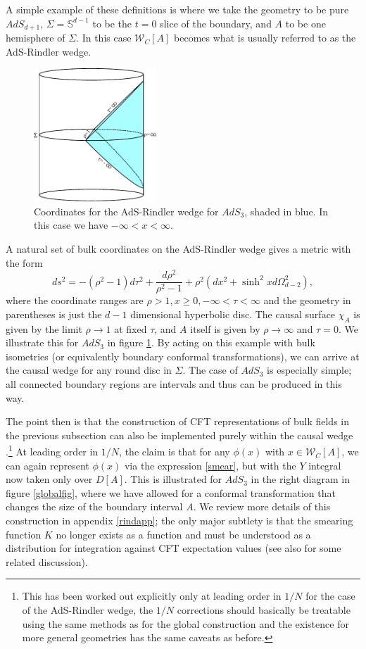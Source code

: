 \documentclass[12pt]{article}
\newcommand{\be}{\begin{equation}}
\newcommand{\ee}{\end{equation}}
\newcommand{\W}{\mathcal{W}}
\begin{document}
A simple example of these definitions is where we take the geometry to be pure $AdS_{d+1}$, $\Sigma=\mathbb{S}^{d-1}$ to be the $t=0$ slice of the boundary, and $A$ to be one hemisphere of $\Sigma$.  In this case $\W_C[A]$ becomes what is usually referred to as the AdS-Rindler wedge.   
\begin{figure}
\begin{center}
\includegraphics[height=5cm]{rindler.pdf}
\caption{Coordinates for the AdS-Rindler wedge for $AdS_3$, shaded in blue.  In this case we have $-\infty<x<\infty$.}\label{rindlerfig}
\end{center}
\end{figure}
A natural set of bulk coordinates on the AdS-Rindler wedge gives a metric with the form
\be
ds^2=-(\rho^2-1)d\tau^2+\frac{d\rho^2}{\rho^2-1}+\rho^2\left(dx^2+\sinh^2 x d\Omega_{d-2}^2\right),
\ee
where the coordinate ranges are $\rho>1, x\geq 0,-\infty<\tau<\infty$ and the geometry in parentheses is just the $d-1$ dimensional hyperbolic disc.  The causal surface $\chi_A$ is given by the limit $\rho \to 1$ at fixed $\tau$, and $A$ itself is given by $\rho\to \infty$ and $\tau=0$.  We illustrate this for $AdS_3$ in figure \ref{rindlerfig}.  By acting on this example with bulk isometries (or equivalently boundary conformal transformations), we can arrive at the causal wedge for any round disc in $\Sigma$.  The case of $AdS_3$ is especially simple; all connected boundary regions are intervals and thus can be produced in this way.  

The point then is that the construction of CFT representations of bulk fields in the previous subsection can also be implemented purely within the causal wedge \cite{Hamilton:2006az}.\footnote{This has been worked out explicitly only at leading order in $1/N$ for the case of the AdS-Rindler wedge, the $1/N$ corrections should basically be treatable using the same methods as for the global construction and the existence for more general geometries has the same caveats as before.} At leading order in $1/N$, the claim is that for any $\phi(x)$ with $x\in \W_C[A]$, we can again represent $\phi(x)$ via the expression \eqref{smear}, but with the $Y$ integral now taken only over $D[A]$.  This is illustrated for $AdS_3$ in the right diagram in figure \ref{globalfig}, where we have allowed for a conformal transformation that changes the size of the boundary interval $A$.  We review more details of this construction in appendix \ref{rindapp}; the only major subtlety is that the smearing function $K$ no longer exists as a function and must be understood as a distribution for integration against CFT expectation values \cite{Morrison:2014jha} (see also \cite{Papadodimas:2012aq} for some related discussion).  
\end{document}
